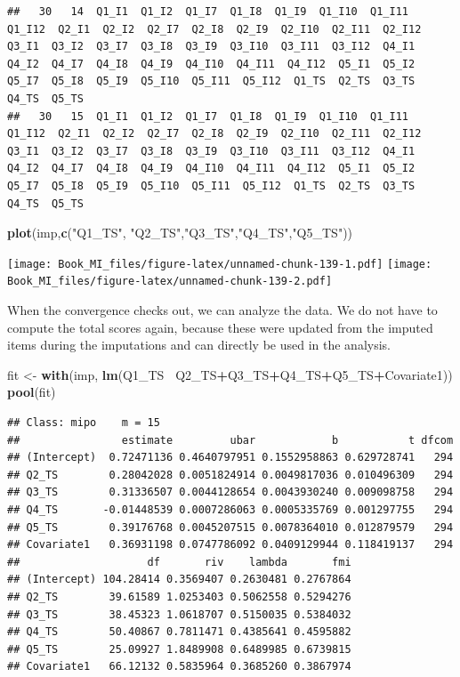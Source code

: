 \documentclass[]{book}
\newenvironment{Shaded}{\begin{snugshade}}{\end{snugshade}}
\newcommand{\KeywordTok}[1]{\textcolor[rgb]{0.13,0.29,0.53}{\textbf{#1}}}
\newcommand{\StringTok}[1]{\textcolor[rgb]{0.31,0.60,0.02}{#1}}
\newcommand{\OperatorTok}[1]{\textcolor[rgb]{0.81,0.36,0.00}{\textbf{#1}}}
\newcommand{\NormalTok}[1]{#1}
\begin{document}
\begin{verbatim}
##   30   14  Q1_I1  Q1_I2  Q1_I7  Q1_I8  Q1_I9  Q1_I10  Q1_I11  Q1_I12  Q2_I1  Q2_I2  Q2_I7  Q2_I8  Q2_I9  Q2_I10  Q2_I11  Q2_I12  Q3_I1  Q3_I2  Q3_I7  Q3_I8  Q3_I9  Q3_I10  Q3_I11  Q3_I12  Q4_I1  Q4_I2  Q4_I7  Q4_I8  Q4_I9  Q4_I10  Q4_I11  Q4_I12  Q5_I1  Q5_I2  Q5_I7  Q5_I8  Q5_I9  Q5_I10  Q5_I11  Q5_I12  Q1_TS  Q2_TS  Q3_TS  Q4_TS  Q5_TS
##   30   15  Q1_I1  Q1_I2  Q1_I7  Q1_I8  Q1_I9  Q1_I10  Q1_I11  Q1_I12  Q2_I1  Q2_I2  Q2_I7  Q2_I8  Q2_I9  Q2_I10  Q2_I11  Q2_I12  Q3_I1  Q3_I2  Q3_I7  Q3_I8  Q3_I9  Q3_I10  Q3_I11  Q3_I12  Q4_I1  Q4_I2  Q4_I7  Q4_I8  Q4_I9  Q4_I10  Q4_I11  Q4_I12  Q5_I1  Q5_I2  Q5_I7  Q5_I8  Q5_I9  Q5_I10  Q5_I11  Q5_I12  Q1_TS  Q2_TS  Q3_TS  Q4_TS  Q5_TS
\end{verbatim}

\begin{Shaded}
\begin{Highlighting}[]
\KeywordTok{plot}\NormalTok{(imp,}\KeywordTok{c}\NormalTok{(}\StringTok{"Q1_TS"}\NormalTok{, }\StringTok{"Q2_TS"}\NormalTok{,}\StringTok{"Q3_TS"}\NormalTok{,}\StringTok{"Q4_TS"}\NormalTok{,}\StringTok{"Q5_TS"}\NormalTok{))}
\end{Highlighting}
\end{Shaded}

\texttt{[image: Book\_MI\_files/figure-latex/unnamed-chunk-139-1.pdf]}
\texttt{[image: Book\_MI\_files/figure-latex/unnamed-chunk-139-2.pdf]}

When the convergence checks out, we can analyze the data. We do not have
to compute the total scores again, because these were updated from the
imputed items during the imputations and can directly be used in the
analysis.

\begin{Shaded}
\begin{Highlighting}[]
\NormalTok{fit <-}\StringTok{ }\KeywordTok{with}\NormalTok{(imp, }\KeywordTok{lm}\NormalTok{(Q1_TS}\OperatorTok{~}\StringTok{ }\NormalTok{Q2_TS}\OperatorTok{+}\NormalTok{Q3_TS}\OperatorTok{+}\NormalTok{Q4_TS}\OperatorTok{+}\NormalTok{Q5_TS}\OperatorTok{+}\NormalTok{Covariate1))}
\KeywordTok{pool}\NormalTok{(fit)}
\end{Highlighting}
\end{Shaded}

\begin{verbatim}
## Class: mipo    m = 15 
##                estimate         ubar            b           t dfcom
## (Intercept)  0.72471136 0.4640797951 0.1552958863 0.629728741   294
## Q2_TS        0.28042028 0.0051824914 0.0049817036 0.010496309   294
## Q3_TS        0.31336507 0.0044128654 0.0043930240 0.009098758   294
## Q4_TS       -0.01448539 0.0007286063 0.0005335769 0.001297755   294
## Q5_TS        0.39176768 0.0045207515 0.0078364010 0.012879579   294
## Covariate1   0.36931198 0.0747786092 0.0409129944 0.118419137   294
##                    df       riv    lambda       fmi
## (Intercept) 104.28414 0.3569407 0.2630481 0.2767864
## Q2_TS        39.61589 1.0253403 0.5062558 0.5294276
## Q3_TS        38.45323 1.0618707 0.5150035 0.5384032
## Q4_TS        50.40867 0.7811471 0.4385641 0.4595882
## Q5_TS        25.09927 1.8489908 0.6489985 0.6739815
## Covariate1   66.12132 0.5835964 0.3685260 0.3867974
\end{verbatim}
\end{document}
